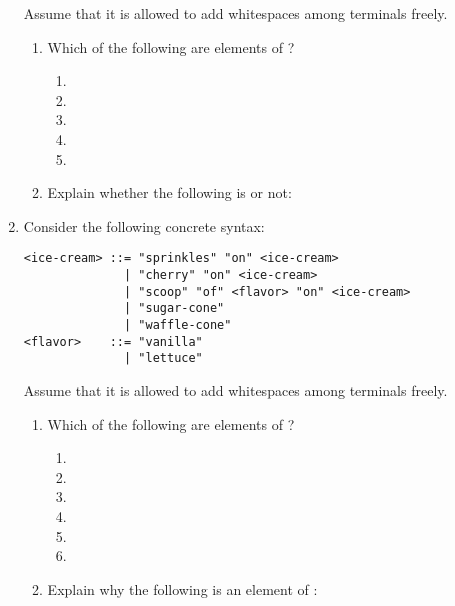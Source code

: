 \begin{enumerate}
Assume that it is allowed to add whitespaces among terminals freely.

\begin{enumerate}
  \item Which of the following are elements of ?
  \begin{enumerate}
    \item {}
    \item {}
    \item {}
    \item {}
    \item {}
  \end{enumerate}
  \item Explain whether the following is  or not:

\end{enumerate}

\item Consider the following concrete syntax:

\begin{verbatim}
<ice-cream> ::= "sprinkles" "on" <ice-cream>
              | "cherry" "on" <ice-cream>
              | "scoop" "of" <flavor> "on" <ice-cream>
              | "sugar-cone"
              | "waffle-cone"
<flavor>    ::= "vanilla"
              | "lettuce"
\end{verbatim}

Assume that it is allowed to add whitespaces among terminals freely.

\begin{enumerate}
  \item Which of the following are elements of ?
  \begin{enumerate}
    \item {}
    \item {}
    \item {}
    \item {}
    \item {}
    \item {}
  \end{enumerate}
  \item Explain why the following is an element of :

\end{enumerate}
\end{enumerate}

